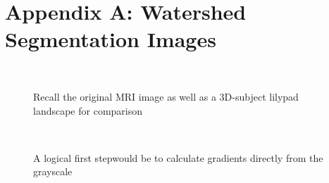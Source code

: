 \documentclass[12pt]{article}
\theoremstyle{plain}%
\theoremstyle{definition}
\theoremstyle{remark}
\begin{document}
\section{Appendix A: Watershed Segmentation Images}

\begin{figure}[!h]
	\centering
		\mbox{\quad
		}
		\caption{Recall the original MRI image as well as a 3D-subject lilypad landscape for comparison}
\end{figure}

\begin{figure}[!h]
	\centering
		\mbox{\quad
		}
		\caption{A logical first stepwould be to calculate gradients directly from the grayscale}
\end{figure}
\end{document}
